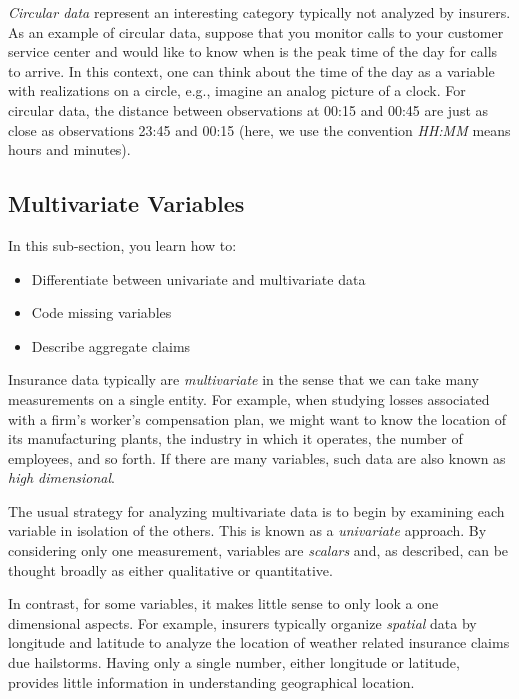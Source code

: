 \documentclass[]{book}
\providecommand{\tightlist}{%
  \setlength{\itemsep}{0pt}\setlength{\parskip}{0pt}}
\theoremstyle{definition}
\theoremstyle{definition}
\theoremstyle{definition}
\theoremstyle{remark}
\begin{document}
\emph{Circular data} represent an interesting category typically not
analyzed by insurers. As an example of circular data, suppose that you
monitor calls to your customer service center and would like to know
when is the peak time of the day for calls to arrive. In this context,
one can think about the time of the day as a variable with realizations
on a circle, e.g., imagine an analog picture of a clock. For circular
data, the distance between observations at 00:15 and 00:45 are just as
close as observations 23:45 and 00:15 (here, we use the convention
\emph{HH:MM} means hours and minutes).

\subsection{Multivariate Variables}\label{multivariate-variables}

In this sub-section, you learn how to:

\begin{itemize}
\tightlist
\item
  Differentiate between univariate and multivariate data
\item
  Code missing variables
\item
  Describe aggregate claims
\end{itemize}

Insurance data typically are \emph{multivariate} in the sense that we
can take many measurements on a single entity. For example, when
studying losses associated with a firm's worker's compensation plan, we
might want to know the location of its manufacturing plants, the
industry in which it operates, the number of employees, and so forth. If
there are many variables, such data are also known as \emph{high
dimensional}.

The usual strategy for analyzing multivariate data is to begin by
examining each variable in isolation of the others. This is known as a
\emph{univariate} approach. By considering only one measurement,
variables are \emph{scalars} and, as described, can be thought broadly
as either qualitative or quantitative.

In contrast, for some variables, it makes little sense to only look a
one dimensional aspects. For example, insurers typically organize
\emph{spatial} data by longitude and latitude to analyze the location of
weather related insurance claims due hailstorms. Having only a single
number, either longitude or latitude, provides little information in
understanding geographical location.
\end{document}
